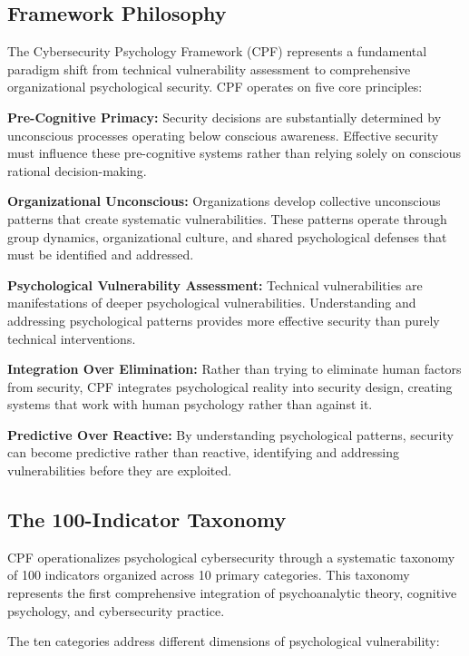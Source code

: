 \documentclass[10pt, twocolumn]{article}
\begin{document}
\subsection{Framework Philosophy}

The Cybersecurity Psychology Framework (CPF) represents a fundamental paradigm shift from technical vulnerability assessment to comprehensive organizational psychological security. CPF operates on five core principles:

\textbf{Pre-Cognitive Primacy:} Security decisions are substantially determined by unconscious processes operating below conscious awareness. Effective security must influence these pre-cognitive systems rather than relying solely on conscious rational decision-making.

\textbf{Organizational Unconscious:} Organizations develop collective unconscious patterns that create systematic vulnerabilities. These patterns operate through group dynamics, organizational culture, and shared psychological defenses that must be identified and addressed.

\textbf{Psychological Vulnerability Assessment:} Technical vulnerabilities are manifestations of deeper psychological vulnerabilities. Understanding and addressing psychological patterns provides more effective security than purely technical interventions.

\textbf{Integration Over Elimination:} Rather than trying to eliminate human factors from security, CPF integrates psychological reality into security design, creating systems that work with human psychology rather than against it.

\textbf{Predictive Over Reactive:} By understanding psychological patterns, security can become predictive rather than reactive, identifying and addressing vulnerabilities before they are exploited.

\subsection{The 100-Indicator Taxonomy}

CPF operationalizes psychological cybersecurity through a systematic taxonomy of 100 indicators organized across 10 primary categories. This taxonomy represents the first comprehensive integration of psychoanalytic theory, cognitive psychology, and cybersecurity practice.

The ten categories address different dimensions of psychological vulnerability:
\end{document}
